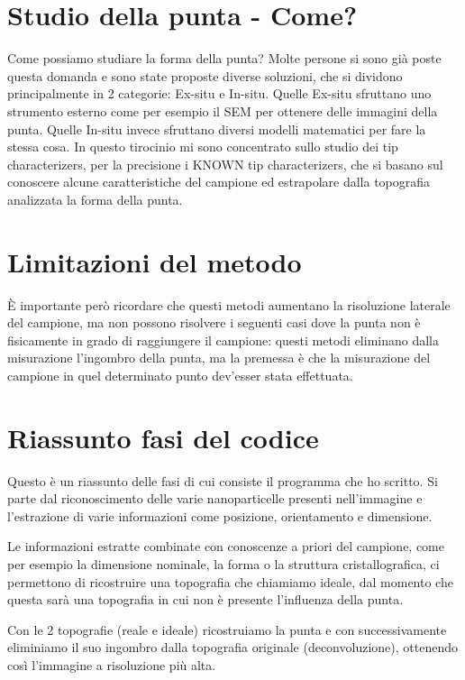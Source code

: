 \documentclass[12pt]{report}
\begin{document}
\section{Studio della punta - Come?}

Come possiamo studiare la forma della punta? Molte persone si sono già poste questa domanda e sono state proposte diverse soluzioni, che si dividono principalmente in 2 categorie: Ex-situ e In-situ. Quelle Ex-situ sfruttano uno strumento esterno come per esempio il SEM per ottenere delle immagini della punta. Quelle In-situ invece sfruttano diversi modelli matematici per fare la stessa cosa. In questo tirocinio mi sono concentrato sullo studio dei tip characterizers, per la precisione i KNOWN tip characterizers, che si basano sul conoscere alcune caratteristiche del campione ed estrapolare dalla topografia analizzata la forma della punta.

\section{Limitazioni del metodo}

È importante però ricordare che questi metodi aumentano la risoluzione laterale del campione, ma non possono risolvere i seguenti casi dove la punta non è fisicamente in grado di raggiungere il campione: questi metodi eliminano dalla misurazione l'ingombro della punta, ma la premessa è che la misurazione del campione in quel determinato punto dev'esser stata effettuata.

\section{Riassunto fasi del codice}

Questo è un riassunto delle fasi di cui consiste il programma che ho scritto. Si parte dal riconoscimento delle varie nanoparticelle presenti nell'immagine e l'estrazione di varie informazioni come posizione, orientamento e dimensione.

Le informazioni estratte combinate con conoscenze a priori del campione, come per esempio la dimensione nominale, la forma o la struttura cristallografica, ci permettono di ricostruire una topografia che chiamiamo ideale, dal momento che questa sarà una topografia in cui non è presente l'influenza della punta.

Con le 2 topografie (reale e ideale) ricostruiamo la punta e con successivamente eliminiamo il suo ingombro dalla topografia originale (deconvoluzione), ottenendo così l'immagine a risoluzione più alta.
\end{document}
